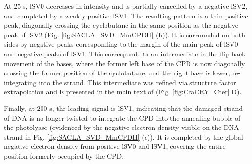 At 25 \textmu s, lSV0 decreases in intensity and is partially cancelled by a negative lSV2, and completed by a weakly positive lSV1. The resulting pattern is a thin positive peak, diagonally crossing the cyclobutane in the same position as the negative peak of lSV2 (Fig. \ref{fig:SACLA_SVD_MmCPDII} (b)). It is surrounded on both sides by negative peaks corresponding to the margin of the main peak of lSV0 and negative peaks of lSV1. This corresponds to an intermediate in the flip-back movement of the bases, where the former left base of the CPD is now diagonally crossing the former position of the cyclobutane, and the right base is lower, re-integrating into the strand. This intermediate was refined via structure factor extrapolation and is presented in the main text of \cite{maestre-reynaVisualizingDNARepair2023a} (Fig. \ref{fig:CraCRY_Cter} D).

Finally, at 200 \textmu s, the leading signal is lSV1, indicating that the damaged strand of DNA is no longer twisted to integrate the CPD into the annealing bubble of the photolyase (evidenced by the negative electron density visible on the DNA strand in Fig. \ref{fig:SACLA_SVD_MmCPDII} (c)). It is completed by the global negative electron density from positive lSV0 and lSV1, covering the entire position formerly occupied by the CPD. 

